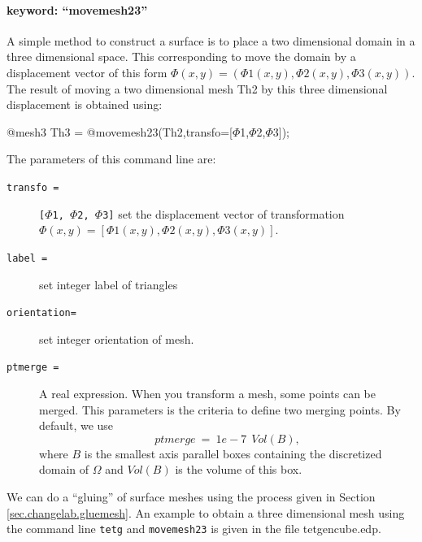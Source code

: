 \documentclass[a4paper,twoside,12pt]{book}
\begin{document}
\paragraph{keyword: ``movemesh23''}

A simple method to construct a surface is to place a two dimensional domain in a three dimensional space.
This corresponding to move the domain by a displacement vector of this form $\Phi(x,y) = ( \Phi1(x,y), \Phi2(x,y), \Phi3(x,y) )$.
The result of moving a two dimensional mesh Th2 by this three dimensional displacement is obtained using:

\bFF
@mesh3 Th3 = @movemesh23(Th2,transfo=[$\Phi$1,$\Phi$2,$\Phi$3]);
\eFF

The parameters of this command line are:
\begin{description}
\item [\texttt{transfo   =}] \texttt{[$\Phi$1, $\Phi$2, $\Phi$3]} set the displacement vector of transformation $\Phi(x,y) = [\Phi1(x,y), \Phi2(x,y), \Phi3(x,y) ]$.
\item [\texttt{label   =}] set integer label of triangles
\item [\texttt{orientation=}] set integer orientation of mesh.
\item [\texttt{ptmerge =}] A real expression. When you transform a mesh, some points can be merged. This parameters is the criteria to define two merging points. By default, we use
$$
ptmerge \: = \: 1e-7 \: \:Vol( B ),
$$
where $B$ is the smallest axis parallel boxes containing the discretized domain of $\Omega$ and $Vol(B)$ is the volume of this box.
\end{description}

We can do a ``gluing'' of surface meshes using the process given in Section \ref{sec.changelab.gluemesh}. An example to obtain a three dimensional
mesh using the command line \texttt{tetg} and \texttt{movemesh23} is given in the file tetgencube.edp.
\end{document}
